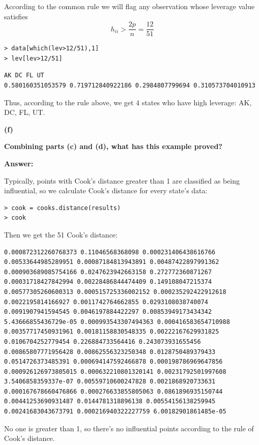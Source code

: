\documentclass[letterpaper,11pt]{article}
\begin{document}
According to the common rule we will flag any observation whose leverage value satisfies
$$h_{ii} > \frac{2p}{n} = \frac{12}{51}$$

\begin{lstlisting}
> data[which(lev>12/51),1]
> lev[lev>12/51]
\end{lstlisting}

\begin{lstlisting}
AK DC FL UT
0.580160351053579 0.719712840922186 0.2984807799694 0.310573704010913
\end{lstlisting}

Thus, according to the rule above, we get 4 states who have high leverage: AK, DC, FL, UT.

\begin{addmargin}[-1.1em]{0em}
\textbf{(f)}\par\end{addmargin}
  \textbf{Combining parts (c) and (d), what has this example proved?}\par
\bigbreak
\begin{addmargin}[-0.5em]{0em}
\textbf{Answer: }\end{addmargin}

Typically, points with Cook's distance greater than 1 are classified as being influential, so we calculate Cook's distance for every state's data:
\begin{lstlisting}
> cook = cooks.distance(results)
> cook
\end{lstlisting}
Then we get the 51 Cook's distance:
\begin{lstlisting}
0.000872312260768373 0.11046568368098 0.000231406438616766 0.00533644985289951 0.00087184813943891 0.00487422897991362 0.000903689085754166 0.0247623942663158 0.272772360871267 0.00031718427842994 0.00228486844474409 0.149108047215374 0.00577305260600313 0.000515725336002152 0.000235292422912618 0.0022195814166927 0.0011742764662855 0.0293108038740074 0.0091907941594545 0.0046197884422297 0.00853949173434342 5.43666855436729e-05 0.000993543307494363 0.000416583654710988 0.00357717450931961 0.00181158830548335 0.00222167629931825 0.0106704252779454 0.226884733564416 0.243073931655456 0.00865807771956428 0.00862556323250348 0.0128750489379433 0.0514726373485391 0.000694147592466878 0.000198786969647856 0.000926126973805015 0.000632210801320141 0.00231792501997608 3.5406858359337e-07 0.00559710600247828 0.0021868920733631 0.000167678660476866 0.000276633855805063 0.0861896935150744 0.00441253690931487 0.0144781318896138 0.00554156138259945 0.00241683043673791 0.000216940322227759 6.00182901861485e-05
\end{lstlisting}
No one is greater than 1, so there's no influential points according to the rule of Cook's distance.
\end{document}
